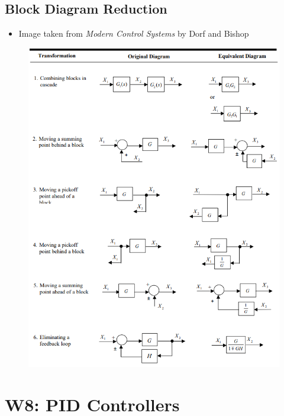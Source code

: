 \documentclass[a4paper]{article}
\begin{document}
\subsection{Block Diagram Reduction}
\begin{itemize}
    \item Image taken from \textit{Modern Control Systems} by Dorf and Bishop
\end{itemize}
\begin{figure}[H]
	\centering
	\includegraphics[width=0.7\linewidth]{blockdiagrams.png}
	\label{fig:blockdiagram}
\end{figure}

\newpage
\section{W8: PID Controllers}
\end{document}
